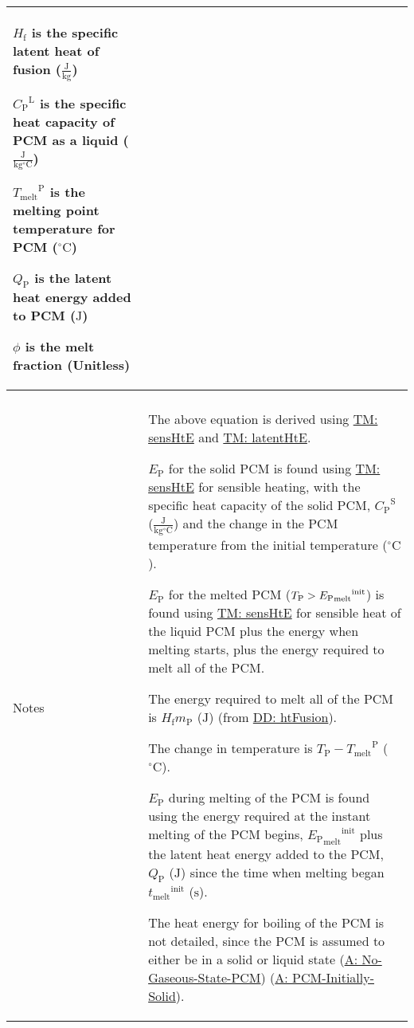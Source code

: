 \documentclass[12pt]{article}
\newcommand{\gt}{\ensuremath >}
\begin{document}
\begin{minipage}{\textwidth}
\begin{tabular}{>{\raggedright}p{}>{\raggedright\arraybackslash}p{}}
\begin{symbDescription}
              \item{${H_{\text{f}}}$ is the specific latent heat of fusion ($\frac{\text{J}}{\text{kg}}$)}
              \item{${{C_{\text{P}}}^{\text{L}}}$ is the specific heat capacity of PCM as a liquid ($\frac{\text{J}}{\text{kg}{}^{\circ}\text{C}}$)}
              \item{${{T_{\text{melt}}}^{\text{P}}}$ is the melting point temperature for PCM (${{}^{\circ}\text{C}}$)}
              \item{${Q_{\text{P}}}$ is the latent heat energy added to PCM (${\text{J}}$)}
              \item{$ϕ$ is the melt fraction (Unitless)}
              \end{symbDescription}
\\ \midrule \\
Notes & The above equation is derived using \hyperref[TM:sensHtE]{TM: sensHtE} and \hyperref[TM:latentHtE]{TM: latentHtE}.
        
        ${E_{\text{P}}}$ for the solid PCM is found using \hyperref[TM:sensHtE]{TM: sensHtE} for sensible heating, with the specific heat capacity of the solid PCM, ${{C_{\text{P}}}^{\text{S}}}$ ($\frac{\text{J}}{\text{kg}{}^{\circ}\text{C}}$) and the change in the PCM temperature from the initial temperature (${{}^{\circ}\text{C}}$).
        
        ${E_{\text{P}}}$ for the melted PCM (${T_{\text{P}}}\gt{}{{{E_{\text{P}}}_{\text{melt}}}^{\text{init}}}$) is found using \hyperref[TM:sensHtE]{TM: sensHtE} for sensible heat of the liquid PCM plus the energy when melting starts, plus the energy required to melt all of the PCM.
        
        The energy required to melt all of the PCM is ${H_{\text{f}}} {m_{\text{P}}}$ (${\text{J}}$) (from \hyperref[DD:htFusion]{DD: htFusion}).
        
        The change in temperature is ${T_{\text{P}}}-{{T_{\text{melt}}}^{\text{P}}}$ (${{}^{\circ}\text{C}}$).
        
        ${E_{\text{P}}}$ during melting of the PCM is found using the energy required at the instant melting of the PCM begins, ${{{E_{\text{P}}}_{\text{melt}}}^{\text{init}}}$ plus the latent heat energy added to the PCM, ${Q_{\text{P}}}$ (${\text{J}}$) since the time when melting began ${{t_{\text{melt}}}^{\text{init}}}$ (${\text{s}}$).
        
        The heat energy for boiling of the PCM is not detailed, since the PCM is assumed to either be in a solid or liquid state (\hyperref[assumpNGSP]{A: No-Gaseous-State-PCM}) (\hyperref[assumpPIS]{A: PCM-Initially-Solid}).
        

\end{tabular}
\end{minipage}
\end{document}
